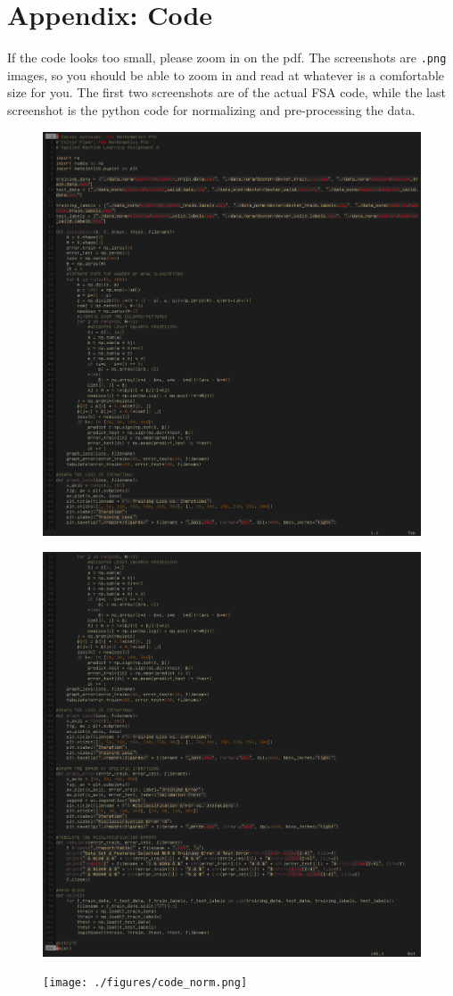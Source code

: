 \documentclass[UTF8]{article}
\begin{document}
\section{Appendix: Code}
If the code looks too small, please zoom in on the pdf.
The screenshots are \texttt{.png} images, so you should be able to zoom in and read at whatever is a comfortable size for you.
The first two screenshots are of the actual FSA code, while the last screenshot is the python code for normalizing and pre-processing the data.
\begin{figure}[H]
    \centering
    \includegraphics[scale=0.7]{./figures/code1.png}
\end{figure}
\begin{figure}[H]
    \centering
    \includegraphics[scale=0.7]{./figures/code2.png}
\end{figure}
\begin{figure}[H]
    \centering
    \texttt{[image: ./figures/code\_norm.png]}
\end{figure}
\end{document}
